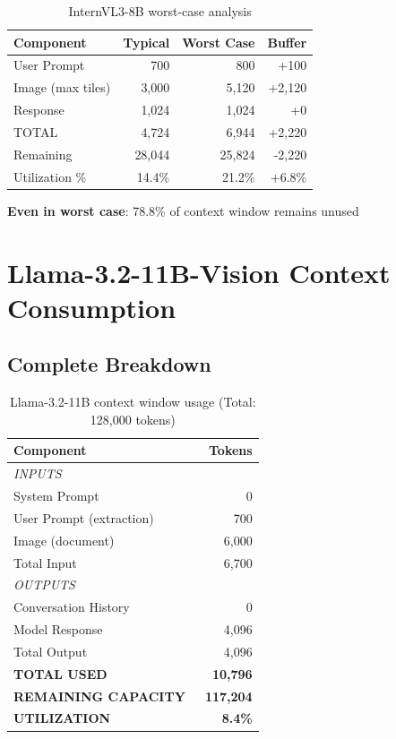 \documentclass[11pt,a4paper]{article}
\begin{document}
\begin{table}[h]
\centering
\small
\begin{tabular}{lrrr}
\toprule
\textbf{Component} & \textbf{Typical} & \textbf{Worst Case} & \textbf{Buffer} \\
\midrule
User Prompt & 700 & 800 & +100 \\
Image (max tiles) & 3,000 & 5,120 & +2,120 \\
Response & 1,024 & 1,024 & +0 \\
\midrule
TOTAL & 4,724 & 6,944 & +2,220 \\
Remaining & 28,044 & 25,824 & -2,220 \\
Utilization \% & 14.4\% & 21.2\% & +6.8\% \\
\bottomrule
\end{tabular}
\caption{InternVL3-8B worst-case analysis}
\end{table}

\textbf{Even in worst case}: 78.8\% of context window remains unused

\section{Llama-3.2-11B-Vision Context Consumption}

\subsection{Complete Breakdown}

\begin{table}[h]
\centering
\begin{tabular}{lr}
\toprule
\textbf{Component} & \textbf{Tokens} \\
\midrule
\multicolumn{2}{l}{\textit{INPUTS}} \\
System Prompt & 0 \\
User Prompt (extraction) & ~700 \\
Image (document) & ~6,000 \\
\midrule
Total Input & ~6,700 \\
\midrule
\multicolumn{2}{l}{\textit{OUTPUTS}} \\
Conversation History & 0 \\
Model Response & 4,096 \\
\midrule
Total Output & 4,096 \\
\midrule
\textbf{TOTAL USED} & \textbf{~10,796} \\
\textbf{REMAINING CAPACITY} & \textbf{~117,204} \\
\midrule
\textbf{UTILIZATION} & \textbf{8.4\%} \\
\bottomrule
\end{tabular}
\caption{Llama-3.2-11B context window usage (Total: 128,000 tokens)}
\end{table}
\end{document}
